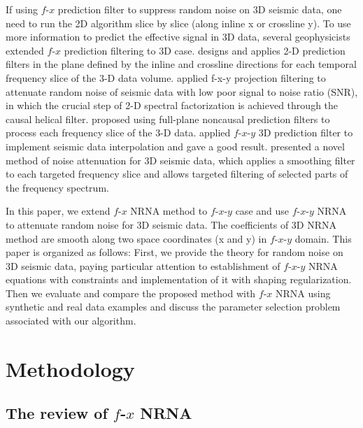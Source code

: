 If using $f$-$x$ prediction filter to suppress random noise on 3D seismic 
data, one need to run the 2D algorithm slice by slice (along inline x or 
crossline y). To use more information to predict the effective signal 
in 3D data, several geophysicists extended $f$-$x$ prediction filtering to 
3D case. \cite{Chase1992} designs and applies 2-D prediction filters in the
 plane defined by the inline and crossline directions for each temporal 
frequency slice of the 3-D data volume. \cite{Ozdemir1999} applied 
f-x-y projection filtering to attenuate random noise of seismic data 
with low poor signal to noise ratio (SNR), in which the crucial step 
of 2-D spectral factorization is achieved through the causal helical 
filter. \cite{Gulunay2000} proposed using full-plane noncausal prediction 
filters to process each frequency slice of the 3-D data. \cite{Wang2002} 
applied $f$-$x$-$y$ 3D prediction filter to implement seismic data interpolation 
and gave a good result. \cite{Hodgson2002} presented a novel method of 
noise attenuation for 3D seismic data, which applies a smoothing filter 
to each targeted frequency slice and allows targeted filtering of selected 
parts of the frequency spectrum.

In this paper, we extend $f$-$x$ NRNA method \cite[]{Liu2012} to $f$-$x$-$y$ case 
and use $f$-$x$-$y$ NRNA to attenuate random noise for 3D seismic data. The 
coefficients of 3D NRNA method are smooth along two space coordinates 
(x and y) in $f$-$x$-$y$ domain. This paper is organized as follows: First, 
we provide the theory for random noise on 3D seismic data, paying 
particular attention to establishment of $f$-$x$-$y$ NRNA equations with 
constraints and implementation of it with shaping regularization. 
Then we evaluate and compare the proposed method with $f$-$x$ NRNA using 
synthetic and real data examples and discuss the parameter selection 
problem associated with our algorithm. 

\section{Methodology}

 \subsection{The review of $f$-$x$ NRNA}

